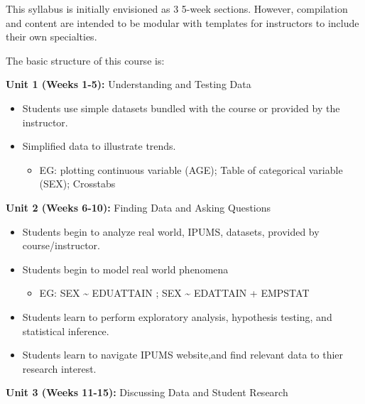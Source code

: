 \documentclass[
]{book}
\providecommand{\tightlist}{%
  \setlength{\itemsep}{0pt}\setlength{\parskip}{0pt}}
\begin{document}
This syllabus is initially envisioned as 3 5-week sections. However, compilation and content are intended to be modular with templates for instructors to include their own specialties.

The basic structure of this course is:

\textbf{Unit 1 (Weeks 1-5):} Understanding and Testing Data

\begin{itemize}
\tightlist
\item
  Students use simple datasets bundled with the course or provided by the instructor.
\item
  Simplified data to illustrate trends.

  \begin{itemize}
  \tightlist
  \item
    EG: plotting continuous variable (AGE); Table of categorical variable (SEX); Crosstabs
  \end{itemize}
\end{itemize}

\textbf{Unit 2 (Weeks 6-10):} Finding Data and Asking Questions

\begin{itemize}
\tightlist
\item
  Students begin to analyze real world, IPUMS, datasets, provided by course/instructor.
\item
  Students begin to model real world phenomena

  \begin{itemize}
  \tightlist
  \item
    EG: SEX \textasciitilde{} EDUATTAIN ; SEX \textasciitilde{} EDATTAIN + EMPSTAT
  \end{itemize}
\item
  Students learn to perform exploratory analysis, hypothesis testing, and statistical inference.
\item
  Students learn to navigate IPUMS website,and find relevant data to thier research interest.
\end{itemize}

\textbf{Unit 3 (Weeks 11-15):} Discussing Data and Student Research
\end{document}
